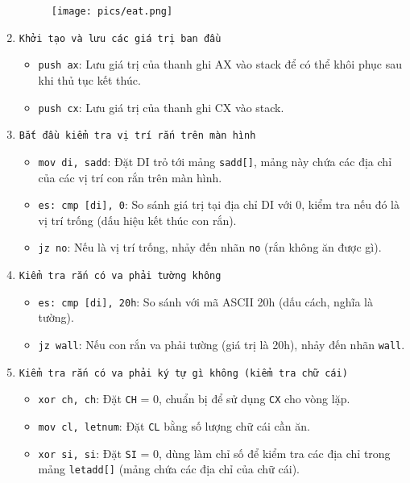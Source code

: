 \documentclass[12pt]{article}
\begin{document}
\begin{enumerate}[label=\textbf{\arabic*.}]
        \begin{figure}[H]
  \centering
  \texttt{[image: pics/eat.png]}
\end{figure}
    \item \texttt{Khởi tạo và lưu các giá trị ban đầu}
    \begin{itemize}
        \item \texttt{push ax}: Lưu giá trị của thanh ghi AX vào stack để có thể khôi phục sau khi thủ tục kết thúc.
        \item \texttt{push cx}: Lưu giá trị của thanh ghi CX vào stack.
    \end{itemize}

    \item \texttt{Bắt đầu kiểm tra vị trí rắn trên màn hình}
    \begin{itemize}
        \item \texttt{mov di, sadd}: Đặt DI trỏ tới mảng \texttt{sadd[]}, mảng này chứa các địa chỉ của các vị trí con rắn trên màn hình.
        \item \texttt{es: cmp [di], 0}: So sánh giá trị tại địa chỉ DI với 0, kiểm tra nếu đó là vị trí trống (dấu hiệu kết thúc con rắn).
        \item \texttt{jz no}: Nếu là vị trí trống, nhảy đến nhãn \texttt{no} (rắn không ăn được gì).
    \end{itemize}

    \item \texttt{Kiểm tra rắn có va phải tường không}
    \begin{itemize}
        \item \texttt{es: cmp [di], 20h}: So sánh với mã ASCII 20h (dấu cách, nghĩa là tường).
        \item \texttt{jz wall}: Nếu con rắn va phải tường (giá trị là 20h), nhảy đến nhãn \texttt{wall}.
    \end{itemize}

    \item \texttt{Kiểm tra rắn có va phải ký tự gì không (kiểm tra chữ cái)}
    \begin{itemize}
        \item \texttt{xor ch, ch}: Đặt \texttt{CH} = 0, chuẩn bị để sử dụng \texttt{CX} cho vòng lặp.
        \item \texttt{mov cl, letnum}: Đặt \texttt{CL} bằng số lượng chữ cái cần ăn.
        \item \texttt{xor si, si}: Đặt \texttt{SI} = 0, dùng làm chỉ số để kiểm tra các địa chỉ trong mảng \texttt{letadd[]} (mảng chứa các địa chỉ của chữ cái).
    \end{itemize}


\end{enumerate}
\end{document}
